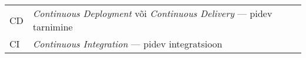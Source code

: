 \begin{longtable}{p{3cm}p{10cm}}
CD&\textit{Continuous Deployment} või \textit{Continuous Delivery} — pidev tarnimine\\
CI&\textit{Continuous Integration} — pidev integratsioon\\
\end{longtable}
\addtocounter{table}{-1} 

